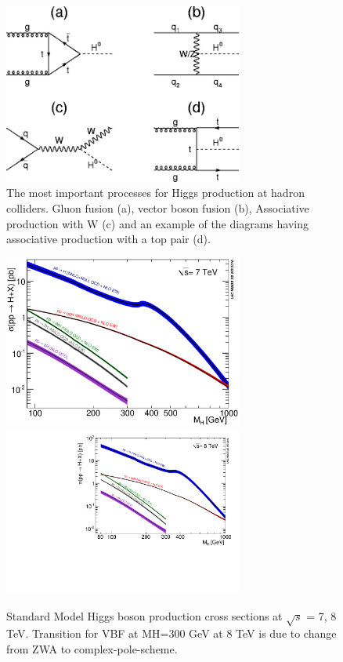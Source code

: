 \begin{figure}[htb]
\centering
\includegraphics[width=0.7\textwidth]{StandardModel/feynman_higgs_production.jpg}
\caption{\small The most important processes for Higgs production at hadron colliders. Gluon fusion (a), vector boson fusion (b), Associative production with W (c) and an example of the diagrams having associative production with a top pair (d). ~\cite{Egede_Feynman_Higgs}
         }
\label{fig:Higgs_Feynman_diag}
\end{figure}


\begin{figure}[htb]
\centering
\includegraphics[width=0.7\textwidth]{StandardModel/Higgs_XS_7TeV.eps}
\includegraphics[width=0.7\textwidth]{StandardModel/Higgs_XS_8TeV_lx.pdf}
\caption{\small Standard Model Higgs boson production cross sections at $\sqrt{s}$ = 7, 8 TeV. Transition for VBF at MH=300 GeV at 8 TeV is due to change from ZWA to complex-pole-scheme.~\cite{LHC_Higgs_Gallery}
         }
\label{fig:LHC_higgs_production}
\end{figure}

